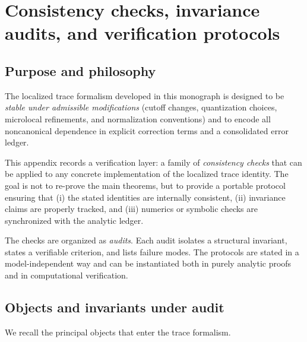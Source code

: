 
\appendix
\chapter{Consistency checks, invariance audits, and verification protocols}
\label{app:E.consistency}

\section{Purpose and philosophy}
\label{sec:E.purpose}

The localized trace formalism developed in this monograph is designed to be \emph{stable under admissible
modifications} (cutoff changes, quantization choices, microlocal refinements, and normalization conventions) and to
encode all noncanonical dependence in explicit correction terms and a consolidated error ledger.

This appendix records a verification layer: a family of \emph{consistency checks} that can be applied to any concrete
implementation of the localized trace identity.  The goal is not to re-prove the main theorems, but to provide a
portable protocol ensuring that (i) the stated identities are internally consistent, (ii) invariance claims are
properly tracked, and (iii) numerics or symbolic checks are synchronized with the analytic ledger.

The checks are organized as \emph{audits}.  Each audit isolates a structural invariant, states a verifiable criterion,
and lists failure modes.  The protocols are stated in a model-independent way and can be instantiated both in purely
analytic proofs and in computational verification.

\section{Objects and invariants under audit}
\label{sec:E.objects}

We recall the principal objects that enter the trace formalism.


